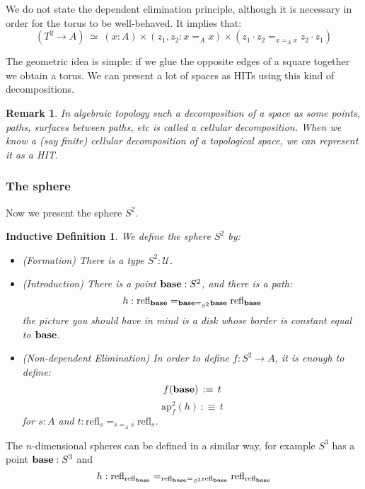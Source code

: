 \documentclass{article}
\newcommand{\ssse}[1]{\subsubsection*{#1}}
\newcommand{\U}{{\mathcal U}}
\renewcommand{\r}{\rightarrow}
\newcommand{\ap}{\mathrm{ap}}
\newcommand{\refl}{\mathrm{refl}}
\newcommand{\base}{\mathrm{\bf base}}
\newtheorem{remark}{Remark}
\newtheorem{ind_def}{Inductive Definition}
\begin{document}
We do not state the dependent elimination principle, although it is necessary in order for the torus to be well-behaved. It implies that:
\[(T^2\r A) \ \simeq \ (x:A)\times(z_1,z_2:x=_Ax)\times (z_1\cdot z_2 =_{x=_Ax} z_2\cdot z_1)\]

The geometric idea is simple: if we glue the opposite edges of a square together we obtain a torus. We can present a lot of spaces as HITs using this kind of decompositions.

\begin{remark}
In algebraic topology such a decomposition of a space as some points, paths, surfaces between paths, etc is called a cellular decomposition. When we know a (say finite) cellular decomposition of a topological space, we can represent it as a HIT.
\end{remark}


\ssse{The sphere}

Now we present the sphere $S^2$.

\begin{ind_def}
We define the sphere $S^2$ by:
\begin{itemize}
\item (Formation) There is a type $S^2:\U$.
\item (Introduction) There is a point $\base:S^2$, and there is a path:
\[h:\refl_\base =_{\base=_{S^2}\base}\refl_\base\]
the picture you should have in mind is a disk whose border is constant equal to $\base$.
\item (Non-dependent Elimination) In order to define $f:S^2\r A$, it is enough to define:
\[f(\base)\, :\equiv\, t\]
\[\ap^2_f(h) \, :\equiv\, t\]
for $s:A$ and $t:\refl_s=_{s=_As}\refl_s$.
\end{itemize}
\end{ind_def}

The $n$-dimensional spheres can be defined in a similar way, for example $S^3$ has a point $\base:S^3$ and 
\[h:\refl_{\refl_\base} =_{\refl_\base =_{S^3}\refl_\base} \refl_{\refl_\base}\]






\end{document}
